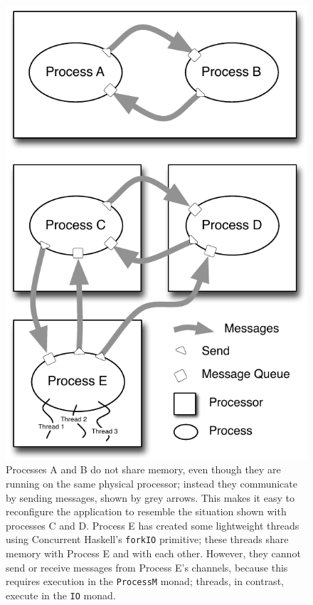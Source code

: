 \documentclass[preprint]{sigplanconf}
\begin{document}
\begin{figure}[t]
\centerline {
\includegraphics[width=\columnwidth]{threadsAndProcesses}
}
\caption{ 
\label{fig:ProcessBubbles}
Processes A and B do not share memory, even though they are running on the same physical processor; instead they communicate by sending messages, shown by grey arrows.  This makes it easy to reconfigure the application to resemble the situation shown with processes C and D.  Process E has created some lightweight threads using Concurrent Haskell's \texttt{forkIO} primitive; these threads share memory with Process E and with each other.  However, they cannot send or receive messages from Process E's channels, because this requires execution in the \texttt{ProcessM} monad; threads, in contrast, execute in the \texttt{IO} monad.
}
\end{figure}
\end{document}
